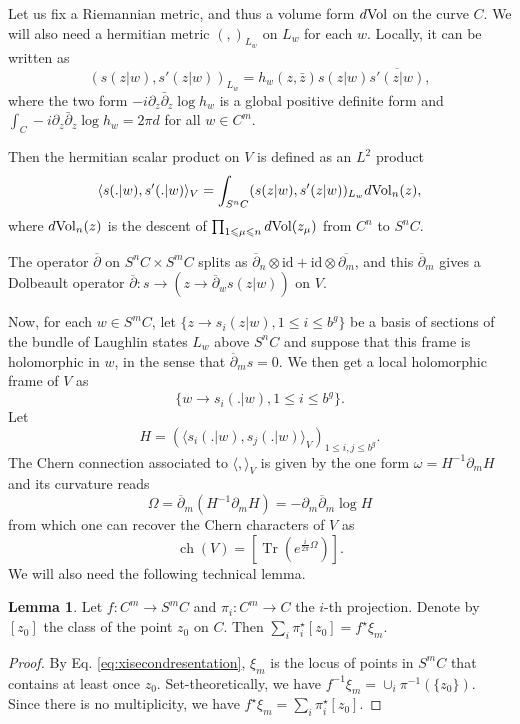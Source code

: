 \documentclass{article}
\theoremstyle{definition}
\newcounter{sharedcounter}[section]
\newtheorem{lemma}[sharedcounter]{Lemma}
\DeclareMathOperator{\ch}{ch}
\DeclareMathOperator{\tr}{Tr}
\newcommand{\ov}[1]{\overline{#1}}
\renewcommand{\leq}{\leqslant}
\begin{document}
Let us fix a Riemannian metric, and thus a volume form $d{\rm Vol }$ on the curve $C$. We will also need a hermitian metric $(,)_{L_w}$ on $L_w$ for each $w$. Locally, it can be written as 
$$(s(z|w),s'(z|w))_{L_w}=h_w(z,\bar z)s(z|w)\ov{ s'(z|w)},$$
where the two form $-i\partial_z\bar\partial_z\log h_w$ is a global positive definite form and $\int_C -i\partial_z\bar\partial_z\log h_w=2\pi d$ for all $w\in C^m$.

Then the hermitian scalar product on $V$ is defined as an $L^2$ product
$$\langle s(.|w),s'(.|w) \rangle_{V} = \int_{S^n C} (s(z|w),s'(z|w))_{L_w} d{\rm Vol }_n(z),$$
where $d{\rm Vol }_n(z)$ is the descent of $\prod_{1\leq \mu \leq n} d{\rm Vol }(z_\mu)$ from $C^n$ to $S^n C$.


The operator $\ov{\partial}$ on $S^nC\times S^mC$ splits as $\ov{\partial}_n \otimes \text{id} + \text{id} \otimes \ov{\partial_m}$, and this $\ov{\partial}_m$ gives a Dolbeault operator $\ov{\partial}: s \to \left(z\to \ov{\partial}_w s(z|w)\right)$ on $V$.

Now, for each $w \in S^m C$, let $\{z \to s_{i}(z|w),1\leq i \leq b^g\}$ be a basis of sections  of the bundle of Laughlin states $L_w$ above $S^n C$ and suppose that this frame is holomorphic in $w$, in the sense that $\ov{\partial}_ms=0$. We then get a local holomorphic frame of $V$ as $$\{ w\to s_i(.|w), 1\leq i \leq b^g\}.$$ 
Let $$H=(\langle s_i(.|w),s_{j}(.|w)\rangle_{V})_{1\leq i,j\leq b^g}.$$ 
The Chern connection associated to $\langle , \rangle_V$ is given by the one form $\omega=H^{-1} \partial_m H$ and its curvature reads
$$\Omega=\ov{\partial}_m(H^{-1} \partial_m H)=-\partial_m\ov{\partial}_m\log H$$
from which one can recover the Chern characters of $V$ as 
$$\ch(V)=\left[ \tr(e^{\frac{i}{2\pi}\Omega})\right].$$
We will also need the following technical lemma.
\begin{lemma}
\label{lem:descendofsumxi}
Let $f:C^m \to S^mC$ and $\pi_i: C^m \to C$ the $i$-th projection. Denote by $[z_0]$ the class of the point $z_0$ on $C$. Then $\sum_i \pi_i^\star [z_0]=f^\star \xi_m$. 

\end{lemma}


\begin{proof}
By Eq. \eqref{eq:xisecondresentation}, $\xi_m$ is the locus of points in $S^m C$ that contains at least once $z_0$. Set-theoretically, we have $f^{-1} \xi_m=\cup_i \pi^{-1}(\lbrace z_0\rbrace)$. Since there is no multiplicity, we have $f^\star \xi_m=\sum_i \pi_i^\star [z_0]$.

\end{proof}
\end{document}
